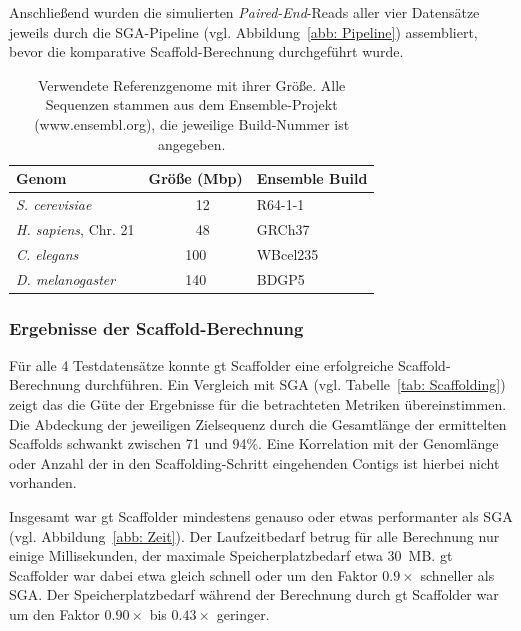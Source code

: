 \documentclass[a4paper,11pt,parskip,abstract=on]{scrartcl}
\begin{document}
Anschließend wurden die simulierten \textit{Paired-End}-Reads aller vier
Datensätze jeweils durch die SGA-Pipeline (vgl. Abbildung~\ref{abb: Pipeline})
assembliert, bevor die komparative Scaffold-Berechnung durchgeführt wurde.

\begin{table}
  \centering
  \begin{tabular}{lcl}
    Genom & Größe (Mbp) & Ensemble Build \\
    \hline
    \textit{S. cerevisiae} &~~12 & R64-1-1 \\
    \textit{H. sapiens}, Chr. 21 &~~48 & GRCh37 \\
    \textit{C. elegans} & 100 & WBcel235 \\
    \textit{D. melanogaster} & 140 & BDGP5
  \end{tabular}
  \caption{\label{tab: Referenzgenome}Verwendete Referenzgenome mit ihrer
  Größe. Alle Sequenzen stammen aus dem Ensemble-Projekt (www.ensembl.org),
  die jeweilige Build-Nummer ist angegeben.}
\end{table}

\subsubsection*{Ergebnisse der Scaffold-Berechnung}

Für alle 4 Testdatensätze konnte gt Scaffolder eine erfolgreiche
Scaffold-Berechnung durchführen. Ein Vergleich mit SGA (vgl.
Tabelle~\ref{tab: Scaffolding}) zeigt das die Güte der Ergebnisse für die
betrachteten Metriken übereinstimmen. Die Abdeckung der
jeweiligen Zielsequenz durch die Gesamtlänge der ermittelten Scaffolds
schwankt zwischen 71 und 94\%. Eine Korrelation mit der Genomlänge
oder Anzahl der in den Scaffolding-Schritt eingehenden Contigs ist
hierbei nicht vorhanden.

Insgesamt war gt Scaffolder mindestens genauso oder etwas performanter als
SGA (vgl. Abbildung~\ref{abb: Zeit}). Der Laufzeitbedarf betrug für alle
Berechnung nur einige Millisekunden, der maximale Speicherplatzbedarf etwa \SI{30}{MB}. gt
Scaffolder war dabei etwa gleich schnell oder um den Faktor $0.9\times$
schneller als SGA. Der Speicherplatzbedarf während der Berechnung durch gt
Scaffolder war um den Faktor $0.90\times$ bis $0.43\times$ geringer.
\end{document}

